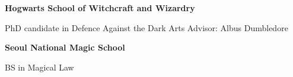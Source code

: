 \documentclass{tidycv} %
\begin{document}
\makecvheader


\begin{cveducations}
    {{\bf Hogwarts School of Witchcraft and Wizardry}} %
    {
    \begin{cveducationitems} %
        PhD candidate in Defence Against the Dark Arts \hfill Advisor: Albus Dumbledore\\
	\end{cveducationitems}
    }
    {{\bf Seoul National Magic School}} %
    {
    \begin{cveducationitems} %
        BS in Magical Law\\
	\end{cveducationitems}
    }
\end{cveducations}
\end{document}

